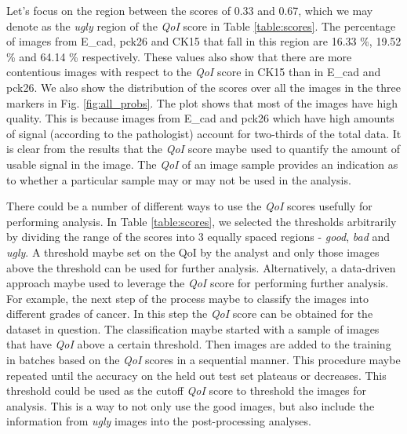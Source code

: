 Let's focus on the region between the scores of 0.33 and 0.67, which we may denote as the \textit{ugly} region of the \textit{QoI} score in Table \ref{table:scores}. The percentage of images from E\_cad, pck26 and CK15 that fall in this region are 16.33 \%, 19.52 \% and 64.14 \% respectively. These values also show that there are more contentious images  with respect to the \textit{QoI} score in CK15 than in E\_cad and pck26.
We also show  the distribution of the scores over all the images in the three markers in Fig. \ref{fig:all_probs}. The plot shows that most of the images have high quality. This is because images from E\_cad and pck26 which have high amounts of signal (according to the pathologist) account for two-thirds of the total data.
It is clear from the results that the \textit{QoI} score maybe used to quantify the amount of usable signal in the image.  The \textit{QoI} of an image sample provides an indication as to whether a particular sample may or may not be used in the analysis. 

There could be a number of different ways to use the \textit{QoI} scores usefully for performing analysis. In Table \ref{table:scores}, we selected the thresholds arbitrarily by dividing the range of the scores into 3 equally spaced regions - \textit{good}, \textit{bad} and \textit{ugly}.  A threshold maybe set on the QoI by the analyst and only those images above the threshold can be used for further analysis. Alternatively, a data-driven approach maybe used to leverage the \textit{QoI} score for performing further analysis. For example, the next step of the process maybe to classify the images into different grades of cancer.
In this step the \textit{QoI} score can be obtained for the dataset in question. The classification maybe started with a sample of images that have \textit{QoI} above a certain threshold. Then images are added to the training in batches based on the \textit{QoI} scores in a sequential manner. This procedure maybe repeated until the accuracy on the held out test set plateaus or decreases. This threshold could be used as the cutoff \textit{QoI} score to threshold the images for analysis. This is a way to not only use the good images, but also include the information from \textit{ugly} images into the post-processing analyses.


